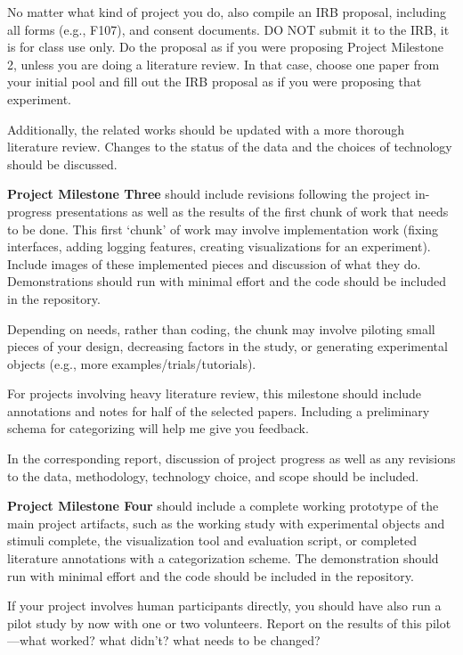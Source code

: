 No matter what kind of project you do, also compile an IRB proposal, including
all forms (e.g., F107), and consent documents. DO NOT submit it to the IRB, it
is for class use only. Do the proposal as if you were proposing Project
Milestone 2, unless you are doing a literature review. In that case, choose
one paper from your initial pool and fill out the IRB proposal as if you were
proposing that experiment.

Additionally, the related works should be updated with a more thorough
literature review. Changes to the status of the data and the choices of
technology should be discussed.

\vspace{1.5ex}\noindent\textbf{Project Milestone Three} should include
revisions following the project in-progress presentations as well as the
results of the first chunk of work that needs to be done. This first `chunk'
of work may involve implementation work (fixing interfaces, adding logging
features, creating visualizations for an experiment). Include images of these
implemented pieces and discussion of what they do. Demonstrations should run
with minimal effort and the code should be included in the repository.

Depending on needs, rather than coding, the chunk may involve piloting small
pieces of your design, decreasing factors in the study, or generating
experimental objects (e.g., more examples/trials/tutorials).

For projects involving heavy literature review, this milestone should include
annotations and notes for half of the selected papers.  Including a
preliminary schema for categorizing will help me give you feedback.

In the corresponding report, discussion of project progress as well as any
revisions to the data, methodology, technology choice, and scope should be
included.

\vspace{1.5ex}\noindent\textbf{Project Milestone Four} should include a
complete working prototype of the main project artifacts, such as the working
study with experimental objects and stimuli complete, the visualization tool
and evaluation script, or completed literature annotations with a
categorization scheme. The demonstration should run with minimal effort and
the code should be included in the repository.

If your project involves human participants directly, you should have also run
a pilot study by now with one or two volunteers. Report on the results of this
pilot---what worked? what didn't? what needs to be changed?

